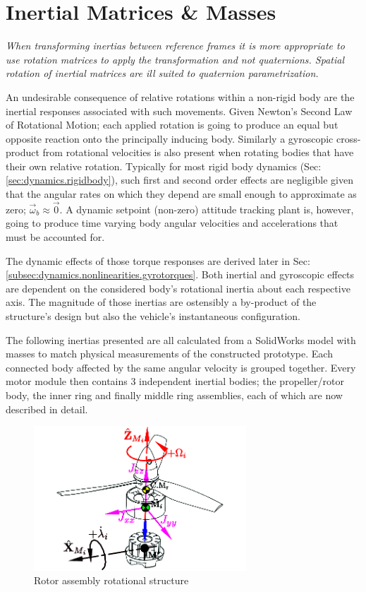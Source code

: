\section{Inertial Matrices \& Masses}
\label{sec:proto.inertia}
\emph{\color{Gray}When transforming inertias between reference frames it is more appropriate to use rotation matrices to apply the transformation and not quaternions. Spatial rotation of inertial matrices are ill suited to quaternion parametrization.}
\par
An undesirable consequence of relative rotations within a non-rigid body are the inertial responses associated with such movements. Given Newton's Second Law of Rotational Motion; each applied rotation is going to produce an equal but opposite reaction onto the principally inducing body. Similarly a gyroscopic cross-product from rotational velocities is also present when rotating bodies that have their own relative rotation. Typically for most rigid body dynamics (Sec:\ref{sec:dynamics.rigidbody}), such first and second order effects are negligible given that the angular rates on which they depend are small enough to approximate as zero; $\vec{\omega}_b\approx\vec{0}$. A dynamic setpoint (non-zero) attitude tracking plant is, however, going to produce time varying body angular velocities and accelerations that must be accounted for.
\par
The dynamic effects of those torque responses are derived later in Sec:\ref{subsec:dynamics.nonlinearities.gyrotorques}. Both inertial and gyroscopic effects are dependent on the considered body's rotational inertia about each respective axis. The magnitude of those inertias are ostensibly a by-product of the structure's design but also the vehicle's instantaneous configuration.
\par
The following inertias presented are all calculated from a SolidWorks model with masses to match physical measurements of the constructed prototype. Each connected body affected by the same angular velocity is grouped together. Every motor module then contains 3 independent inertial bodies; the propeller/rotor body, the inner ring and finally middle ring assemblies, each of which are now described in detail. 
\begin{figure}[hbtp]
\vspace{-6pt}
\centering
\includegraphics[width=0.71\textwidth]{figs/inertia-prop}
\caption{Rotor assembly rotational structure}
\label{fig:inertia-prop}
\vspace{-14pt}
\end{figure}
